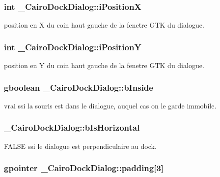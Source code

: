\subsubsection{\setlength{\rightskip}{0pt plus 5cm}int {\bf \_\-CairoDockDialog::iPositionX}}\label{struct__CairoDockDialog_52789327bbacfb15180a878b0a0a0363}


position en X du coin haut gauche de la fenetre GTK du dialogue. 

\subsubsection{\setlength{\rightskip}{0pt plus 5cm}int {\bf \_\-CairoDockDialog::iPositionY}}\label{struct__CairoDockDialog_416a8ef33b989834f7d863b186b50c75}


position en Y du coin haut gauche de la fenetre GTK du dialogue. 

\subsubsection{\setlength{\rightskip}{0pt plus 5cm}gboolean {\bf \_\-CairoDockDialog::bInside}}\label{struct__CairoDockDialog_93bc692e83fca500c910e7db8289d803}


vrai ssi la souris est dans le dialogue, auquel cas on le garde immobile. 

\subsubsection{ {\bf \_\-CairoDockDialog::bIsHorizontal}}\label{struct__CairoDockDialog_6cd286067a839362609dcdef0ecd5db9}


FALSE ssi le dialogue est perpendiculaire au dock. 

\subsubsection{\setlength{\rightskip}{0pt plus 5cm}gpointer {\bf \_\-CairoDockDialog::padding}[3]}\label{struct__CairoDockDialog_d2d60c5f1e4fb4eae623047e207edccb}


